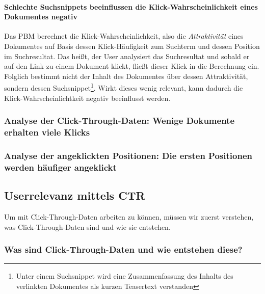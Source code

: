 \paragraph{Schlechte Suchsnippets beeinflussen die Klick-Wahrscheinlichkeit eines Dokumentes negativ}
Das PBM berechnet die Klick-Wahrscheinlichkeit, also die \textit{Attraktivität} eines Dokumentes auf Basis dessen Klick-Häufigkeit zum Suchterm und dessen Position im Suchresultat. Das heißt, der User analysiert das Suchresultat und sobald er auf den Link zu einem Dokument klickt, fließt dieser Klick in die Berechnung ein. Folglich bestimmt nicht der Inhalt des Dokumentes über dessen Attraktivität, sondern dessen Suchsnippet\footnote{Unter einem Suchsnippet wird eine Zusammenfassung des Inhalts des verlinkten Dokumentes als kurzen Teasertext verstanden}. Wirkt dieses wenig relevant, kann dadurch die Klick-Wahrscheinlichtkeit negativ beeinflusst werden.

\pagebreak

\subsubsection{Analyse der Click-Through-Daten: Wenige Dokumente erhalten viele Klicks}
\label{sec:Grundlagen:Grundbegriffe:SemantikUserInteraktionen:DocumentAttraction}



\subsubsection{Analyse der angeklickten Positionen: Die ersten Positionen werden häufiger angeklickt}
\label{sec:Grundlagen:Grundbegriffe:SemantikUserInteraktionen:RankExamination}




\subsection{Userrelevanz mittels CTR}
\label{sec:Grundlagen:Grundbegriffe:Click-Through-Daten}

Um mit Click-Through-Daten arbeiten zu können, müssen wir zuerst verstehen, was Click-Through-Daten sind und wie sie entstehen. 

\subsubsection{Was sind Click-Through-Daten und wie entstehen diese?}
\label{sec:Grundlagen:Grundbegriffe:Click-Through-Daten:WasSindClick-Through-Daten}

